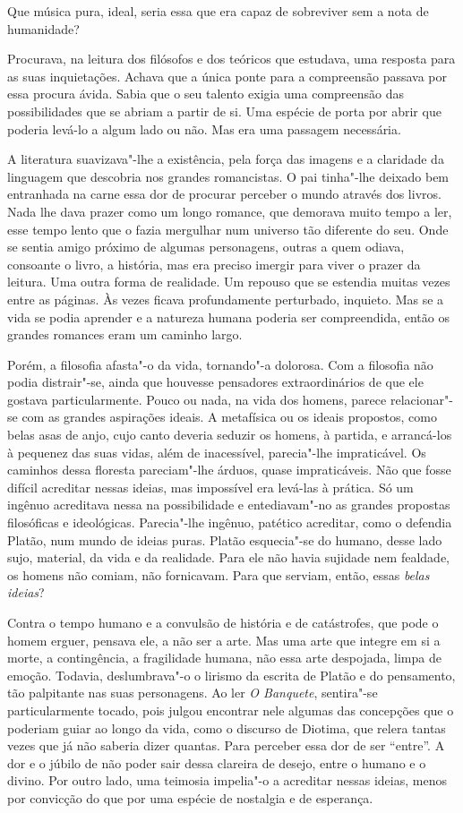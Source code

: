 Que música pura, ideal, seria essa que era capaz de sobreviver sem a
nota de humanidade?

Procurava, na leitura dos filósofos e dos teóricos que estudava, uma
resposta para as suas inquietações. Achava que a única ponte para a
compreensão passava por essa procura ávida. Sabia que o seu talento
exigia uma compreensão das possibilidades que se abriam a partir de si.
Uma espécie de porta por abrir que poderia levá-lo a algum lado ou não.
Mas era uma passagem necessária.

A literatura suavizava"-lhe a existência, pela força das imagens e a
claridade da linguagem que descobria nos grandes romancistas. O pai
tinha"-lhe deixado bem entranhada na carne essa dor de procurar perceber
o mundo através dos livros. Nada lhe dava prazer como um longo romance,
que demorava muito tempo a ler, esse tempo lento que o fazia mergulhar
num universo tão diferente do seu. Onde se sentia amigo próximo de
algumas personagens, outras a quem odiava, consoante o livro, a
história, mas era preciso imergir para viver o prazer da leitura. Uma
outra forma de realidade. Um repouso que se estendia muitas vezes entre
as páginas. Às vezes ficava profundamente perturbado, inquieto. Mas se a
vida se podia aprender e a natureza humana poderia ser compreendida,
então os grandes romances eram um caminho largo.

Porém, a filosofia afasta"-o da vida, tornando"-a dolorosa. Com a
filosofia não podia distrair"-se, ainda que houvesse pensadores
extraordinários de que ele gostava particularmente. Pouco ou nada, na
vida dos homens, parece relacionar"-se com as grandes aspirações ideais.
A metafísica ou os ideais propostos, como belas asas de anjo, cujo canto
deveria seduzir os homens, à partida, e arrancá-los à pequenez das suas
vidas, além de inacessível, parecia"-lhe impraticável. Os caminhos dessa
floresta pareciam"-lhe árduos, quase impraticáveis. Não que fosse difícil
acreditar nessas ideias, mas impossível era levá-las à prática. Só um
ingênuo acreditava nessa na possibilidade e entediavam"-no as grandes
propostas filosóficas e ideológicas. Parecia"-lhe ingênuo, patético
acreditar, como o defendia Platão, num mundo de ideias puras. Platão
esquecia"-se do humano, desse lado sujo, material, da vida e da
realidade. Para ele não havia sujidade nem fealdade, os homens não
comiam, não fornicavam. Para que serviam, então, essas \emph{belas ideias}?

Contra o tempo humano e a convulsão de história e de catástrofes, que
pode o homem erguer, pensava ele, a não ser a arte. Mas uma arte que
integre em si a morte, a contingência, a fragilidade humana, não essa
arte despojada, limpa de emoção. Todavia, deslumbrava"-o o lirismo da
escrita de Platão e do pensamento, tão palpitante nas suas personagens.
Ao ler \emph{O Banquete}, sentira"-se particularmente tocado, pois julgou
encontrar nele algumas das concepções que o poderiam guiar ao longo da
vida, como o discurso de Diotima, que relera tantas vezes que já não
saberia dizer quantas. Para perceber essa dor de ser ``entre''. A dor e
o júbilo de não poder sair dessa clareira de desejo, entre o humano e o
divino. Por outro lado, uma teimosia impelia"-o a acreditar nessas
ideias, menos por convicção do que por uma espécie de nostalgia e de
esperança.

